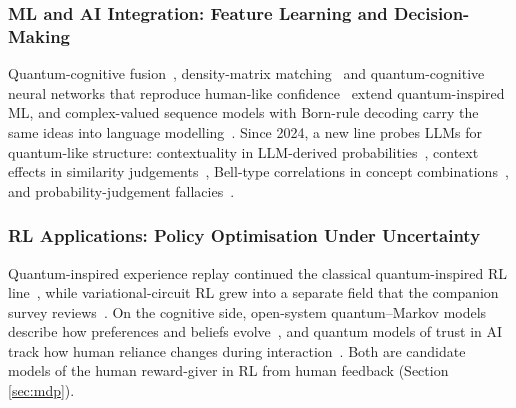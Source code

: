 \documentclass[pdflatex,sn-basic]{sn-jnl}
\begin{document}
\subsubsection{ML and AI Integration: Feature Learning and Decision-Making}
Quantum-cognitive fusion~\citep{Gkoumas2021}, density-matrix matching~\citep{Zhang2025} and quantum-cognitive neural networks that reproduce human-like confidence~\citep{Maksimovic2025} extend quantum-inspired ML, and complex-valued sequence models with Born-rule decoding carry the same ideas into language modelling~\citep{Nebli2026}. Since 2024, a new line probes LLMs for quantum-like structure: contextuality in LLM-derived probabilities~\citep{Lo2025}, context effects in similarity judgements~\citep{Uprety2024}, Bell-type correlations in concept combinations~\citep{Aerts2026}, and probability-judgement fallacies~\citep{Imannezhad2026,Kang2026}.

\subsubsection{RL Applications: Policy Optimisation Under Uncertainty}
Quantum-inspired experience replay continued the classical quantum-inspired RL line~\citep{Wei2022}, while variational-circuit RL grew into a separate field that the companion survey reviews~\citep{Guru2026,Meyer2022}. On the cognitive side, open-system quantum--Markov models describe how preferences and beliefs evolve~\citep{Busemeyer2020,Kvam2021,Epping2023}, and quantum models of trust in AI track how human reliance changes during interaction~\citep{Roeder2023,vanderMeer2025,Humr2025}. Both are candidate models of the human reward-giver in RL from human feedback (Section \ref{sec:mdp}).
\end{document}
